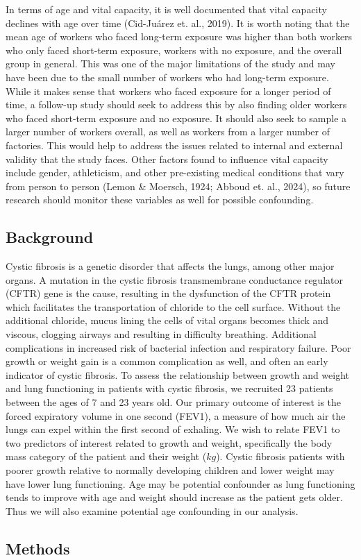 \documentclass{article}
\begin{document}
		In terms of age and vital capacity, it is well documented that vital capacity declines with age over time (Cid-Juárez et. al., 2019). It is worth noting that the mean age of workers who faced long-term exposure was higher than both workers who only faced short-term exposure, workers with no exposure, and the overall group in general. This was one of the major limitations of the study and may have been due to the small number of workers who had long-term exposure. While it makes sense that workers who faced exposure for a longer period of time, a follow-up study should seek to address this by also finding older workers who faced short-term exposure and no exposure. It should also seek to sample a larger number of workers overall, as well as workers from a larger number of factories. This would help to address the issues related to internal and external validity that the study faces. Other factors found to influence vital capacity include gender, athleticism, and other pre-existing medical conditions that vary from person to person (Lemon \& Moersch, 1924; Abboud et. al., 2024), so future research should monitor these variables as well for possible confounding.  


		\newpage
		\subsection*{Background}
		
		Cystic fibrosis is a genetic disorder that affects the lungs, among other major organs. A mutation in the cystic fibrosis transmembrane conductance regulator (CFTR) gene is the cause, resulting in the dysfunction of the CFTR protein which facilitates the transportation of chloride to the cell surface. Without the additional chloride, mucus lining the cells of vital organs becomes thick and viscous, clogging airways and resulting in difficulty breathing. Additional complications in increased risk of bacterial infection and respiratory failure. Poor growth or weight gain is a common complication as well, and often an early indicator of cystic fibrosis. To assess the relationship between growth and weight and lung functioning in patients with cystic fibrosis, we recruited 23 patients between the ages of 7 and 23 years old. Our primary outcome of interest is the forced expiratory volume in one second (FEV1), a measure of how much air the lungs can expel within the first second of exhaling. We wish to relate FEV1 to two predictors of interest related to growth and weight, specifically the body mass category of the patient and their weight ($kg$). Cystic fibrosis patients with poorer growth relative to normally developing children and lower weight may have lower lung functioning. Age may be potential confounder as lung functioning tends to improve with age and weight should increase as the patient gets older. Thus we will also examine potential age confounding in our analysis.

		\subsection*{Methods}
		
\end{document}
